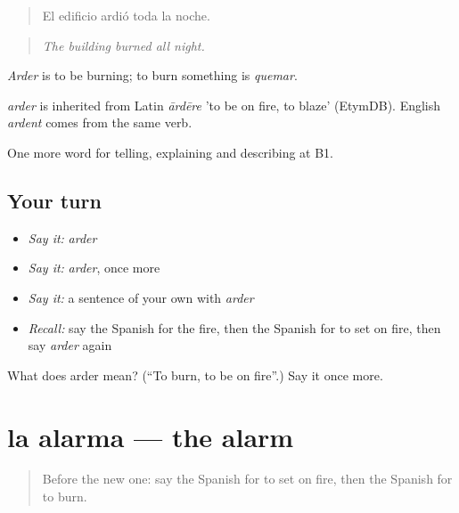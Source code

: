 \begin{quote}
El edificio ardió toda la noche.
\end{quote}

\begin{quote}
\emph{The building burned all night.}
\end{quote}

\emph{Arder} is to be burning; to burn something is \emph{quemar}.

\begin{cousinweb}
\emph{arder} is inherited from Latin \emph{ārdēre} 'to be on fire, to blaze' (EtymDB). English \emph{ardent} comes from the same verb.
\end{cousinweb}

\begin{grammarlens}[title={What you've built}]
One more word for telling, explaining and describing at B1.
\end{grammarlens}

\subsection*{Your turn}
\begin{itemize}
\raggedright
  \item \emph{Say it:} \emph{arder}
  \item \emph{Say it:} \emph{arder}, once more
  \item \emph{Say it:} a sentence of your own with \emph{arder}
  \item \emph{Recall:} say the Spanish for the fire, then the Spanish for to set on fire, then say \emph{arder} again
\end{itemize}

\begin{tcolorbox}[breakable,colback=teal!4,colframe=teal!35!black,title={Before you move on}]
What does arder mean? (\textquotedblleft{}To burn, to be on fire\textquotedblright{}.) Say it once more.
\end{tcolorbox}
\section[la alarma]{la alarma — the alarm}

\label{lesson:ES-C524-alarma}



\begin{quote}
Before the new one: say the Spanish for to set on fire, then the Spanish for to burn.
\end{quote}


